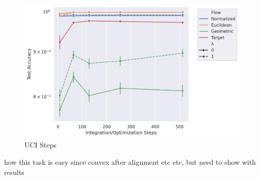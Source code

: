 \begin{figure}[h!]
    \centering
    \includegraphics[width=0.75\linewidth]{figures/uci_17/uci_17_steps.png}
    \caption{\label{fig:uci_steps}UCI Steps} 
\end{figure}




{\color{orange} how this task is easy since convex after alignment etc etc, but need to show with results}